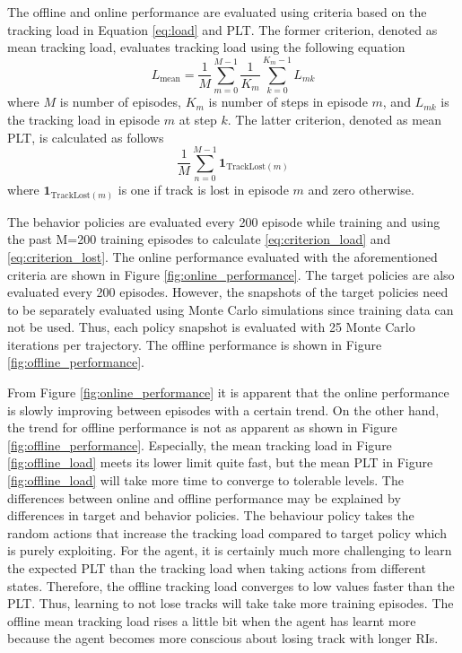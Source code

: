 \documentclass[english, 12pt, a4paper, elec, utf8, a-1b, online]{aaltothesis}
\renewcommand{\vec}[1]{\mathbf{#1}}
\begin{document}
The offline and online performance are evaluated using criteria based on the tracking load in Equation \eqref{eq:load} and PLT.
The former criterion, denoted as mean tracking load, evaluates tracking load using the following equation
\begin{equation}\label{eq:criterion_load}
    L_\text{mean} = \frac{1}{M} \sum_{m=0}^{M-1} \frac{1}{K_m}\sum_{k=0}^{K_m-1} L_{mk}
\end{equation}
where $M$ is number of episodes, $K_m$ is number of steps in episode $m$, and $L_{mk}$ is the tracking load in episode $m$ at step $k$.
The latter criterion, denoted as mean PLT, is calculated as follows
\begin{equation}\label{eq:criterion_lost}
    \frac{1}{M} \sum_{n=0}^{M-1} \vec{1}_{\text{TrackLost}(m)}
\end{equation}
where $\vec{1}_{\text{TrackLost}(m)}$ is one if track is lost in episode $m$ and zero otherwise.

The behavior policies are evaluated every 200 episode while training and using the past M=200 training episodes to calculate \eqref{eq:criterion_load} and \eqref{eq:criterion_lost}.
The online performance evaluated with the aforementioned criteria are shown in Figure \ref{fig:online_performance}.
The target policies are also evaluated every 200 episodes. 
However, the snapshots of the target policies need to be separately evaluated using Monte Carlo simulations since training data can not be used.
Thus, each policy snapshot is evaluated with 25 Monte Carlo iterations per trajectory.
The offline performance is shown in Figure \ref{fig:offline_performance}.

From Figure \ref{fig:online_performance} it is apparent that the online performance is slowly improving between episodes with a certain trend.
On the other hand, the trend for offline performance is not as apparent as shown in Figure \ref{fig:offline_performance}.
Especially, the mean tracking load in Figure \ref{fig:offline_load} meets its lower limit quite fast, but the mean PLT in Figure \ref{fig:offline_load} will take more time to converge to tolerable levels.
The differences between online and offline performance may be explained by differences in target and behavior policies.
The behaviour policy takes the random actions that increase the tracking load compared to target policy which is purely exploiting.
For the agent, it is certainly much more challenging to learn the expected PLT than the tracking load when taking actions from different states.
Therefore, the offline tracking load converges to low values faster than the PLT.
Thus, learning to not lose tracks will take take more training episodes.
The offline mean tracking load rises a little bit when the agent has learnt more because the agent becomes more conscious about losing track with longer RIs.
\end{document}
